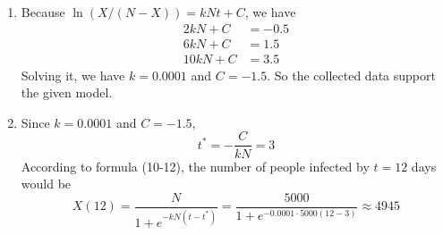 \documentclass[10pt]{report}
\begin{document}
\begin{enumerate}
\begin{enumerate}
		\item 
		Because $\ln (X/(N-X)) = kNt + C$, we have
		\begin{align*}
			2kN + C &= -0.5\\
			6kN + C &= 1.5\\
			10kN + C &= 3.5
		\end{align*}
		Solving it, we have $k=0.0001$ and $C = -1.5$. So the collected data support the given model.
		
		\item 
		Since $k=0.0001$ and $C = -1.5$, 
		\[
		t^* = - \frac{C}{kN} = 3
		\]
		According to formula (10-12), the number of people infected by $t=12$ days would be
		\[
		X(12) = \frac{N}{1 + e^{-k N (t-t^*)}} = \frac{5000}{1 + e^{-0.0001 \cdot 5000 (12-3)}} \approx 4945
		\]
		
	\end{enumerate}
\end{enumerate}
\end{document}
